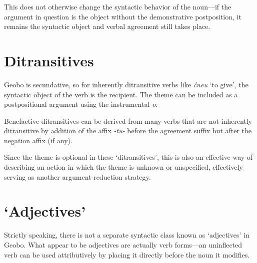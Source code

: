 \documentclass[a4paper,11pt,oneside,openany]{memoir}
\begin{document}
This does not otherwise change the syntactic behavior of the noun---if the argument in question is the object without the demonstrative postposition, it remains the syntactic object and verbal agreement still takes place.

\section{Ditransitives}

Geobo{\engma} is secundative, so for inherently ditransitive verbs like \textit{\'cneu} `to give', the syntactic object of the verb is the recipient. The theme can be included as a postpositional argument using the instrumental \textit{\vc o}.


Benefactive ditransitives can be derived from many verbs that are not inherently ditransitive by addition of the affix \textit{-tu-} before the agreement suffix but after the negation affix (if any).


Since the theme is optional in these `ditransitives', this is also an effective way of describing an action in which the theme is unknown or unspecified, effectively serving as another argument-reduction strategy.


\section{`Adjectives'}

Strictly speaking, there is not a separate syntactic class known as `adjectives' in Geobo{\engma}. What appear to be adjectives are actually verb forms---an uninflected verb can be used attributively by placing it directly before the noun it modifies.
\end{document}
